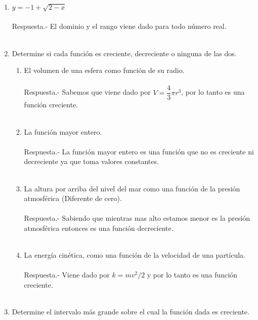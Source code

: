 \begin{enumerate}
\item $y=-1+\sqrt{2-x}$\\\\
    Respuesta.-\; El dominio y el rango viene dado para todo número real.\\\\

\item Determine si cada función es creciente, decreciente o ninguna de las dos.

\begin{enumerate}[\bfseries a)]

    \item El volumen de una esfera como función de su radio.\\\\
	Respuesta.-\; Sabemos que viene dado por $V=\dfrac{4}{3}\pi r^3$, por lo tanto es una función creciente.\\\\

    \item La función mayor entero.\\\\
	Respuesta.-\; La función mayor entero es una función que no es creciente ni decreciente ya que toma valores constantes.\\\\

    \item La altura por arriba del nivel del mar como una función de la presión atmosférica (Diferente de cero).\\\\
	Respuesta.-\; Sabiendo que mientras mas alto estamos menor es la presión atmosférica entonces es una función decreciente.\\\\

    \item La energía cinética, como una función de la velocidad de una partícula.\\\\
	Respuesta.-\; Viene dado por $k=mv^2/2$ y por lo tanto es una función creciente.\\\\

\end{enumerate}

\item Determine el intervalo más grande sobre el cual la función dada es creciente.
\begin{enumerate}[\bfseries a)]


\end{enumerate}
\end{enumerate}
